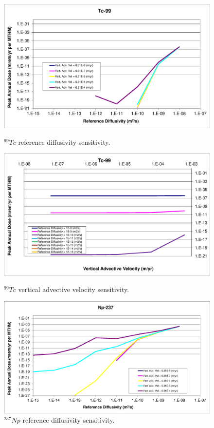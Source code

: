 \begin{figure}[htp!]
\begin{minipage}[b]{0.45\linewidth}
\includegraphics[width=\linewidth]{./chapters/nuclide_sensitivity/clay/AdvVelAndDiffCoeffEBSFail/Tc-99.eps}
\caption{$^{99}Tc$ reference diffusivity sensitivity.}
\label{fig:VAdvVelTc99}

\includegraphics[width=\linewidth]{./chapters/nuclide_sensitivity/clay/AdvVelAndDiffCoeffEBSFail/Tc-99-VAdvVel.eps}
\caption{$^{99}Tc$ vertical advective velocity sensitivity.}
\label{fig:VAdvVelTc99VAdvVel}

\end{minipage}
\hspace{0.05\linewidth}
\begin{minipage}[b]{0.45\linewidth}

\includegraphics[width=\linewidth]{./chapters/nuclide_sensitivity/clay/AdvVelAndDiffCoeffEBSFail/Np-237.eps}
\caption{$^{237}Np$ reference diffusivity sensitivity.}
\label{fig:VAdvVelNp237}


\end{minipage}
\end{figure}
